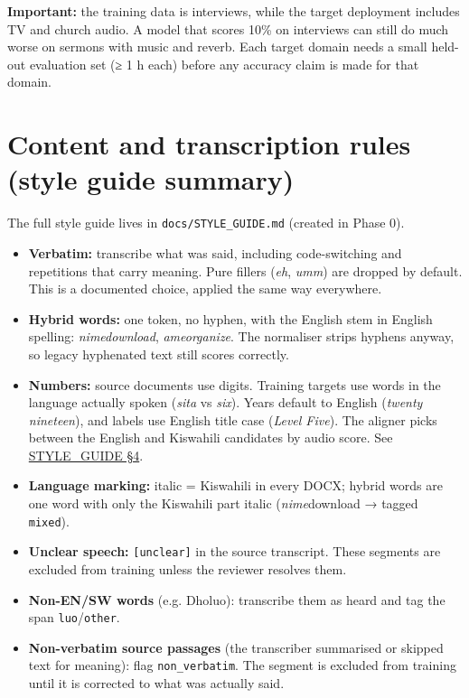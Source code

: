 \documentclass[11pt]{article}
\begin{document}
\textbf{Important:} the training data is interviews, while the target deployment includes TV and church audio. A model that scores 10\% on interviews can still do much worse on sermons with music and reverb. Each target domain needs a small held-out evaluation set (≥ 1 h each) before any accuracy claim is made for that domain.

\hypertarget{content-and-transcription-rules-style-guide-summary}{%
\section{Content and transcription rules (style guide summary)}\label{content-and-transcription-rules-style-guide-summary}}

The full style guide lives in \texttt{docs/\allowbreak{}STYLE\_\allowbreak{}GUIDE.\allowbreak{}md} (created in Phase 0).

\begin{itemize}
\tightlist
\item
  \textbf{Verbatim:} transcribe what was said, including code-switching and repetitions that carry meaning. Pure fillers (\emph{eh}, \emph{umm}) are dropped by default. This is a documented choice, applied the same way everywhere.
\item
  \textbf{Hybrid words:} one token, no hyphen, with the English stem in English spelling: \emph{nimedownload}, \emph{ameorganize}. The normaliser strips hyphens anyway, so legacy hyphenated text still scores correctly.
\item
  \textbf{Numbers:} source documents use digits. Training targets use words in the language actually spoken (\emph{sita} vs \emph{six}). Years default to English (\emph{twenty nineteen}), and labels use English title case (\emph{Level Five}). The aligner picks between the English and Kiswahili candidates by audio score. See \href{STYLE_GUIDE.pdf}{STYLE\_GUIDE §4}.
\item
  \textbf{Language marking:} italic = Kiswahili in every DOCX; hybrid words are one word with only the Kiswahili part italic (\emph{nime}download → tagged \texttt{mixed}).
\item
  \textbf{Unclear speech:} \texttt{[unclear]} in the source transcript. These segments are excluded from training unless the reviewer resolves them.
\item
  \textbf{Non-EN/SW words} (e.g. Dholuo): transcribe them as heard and tag the span \texttt{luo}/\texttt{other}.
\item
  \textbf{Non-verbatim source passages} (the transcriber summarised or skipped text for meaning): flag \texttt{non\_\allowbreak{}verbatim}. The segment is excluded from training until it is corrected to what was actually said.
\end{itemize}
\end{document}

